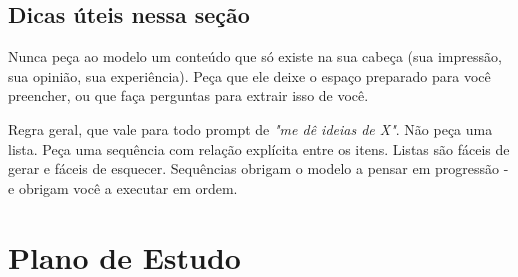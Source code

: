 \documentclass[11pt, a4paper]{article}
\begin{document}
\subsection*{Dicas úteis nessa seção}
Nunca peça ao modelo um conteúdo que só existe na sua cabeça (sua impressão, sua opinião, sua experiência). Peça que ele deixe o espaço preparado para você preencher, ou que faça perguntas para extrair isso de você.

Regra geral, que vale para todo prompt de \textit{"me dê ideias de X"}. Não peça uma lista. Peça uma sequência com relação explícita entre os itens. Listas são fáceis de gerar e fáceis de esquecer. Sequências obrigam o modelo a pensar em progressão - e obrigam você a executar em ordem.

\section*{Plano de Estudo}
\end{document}
